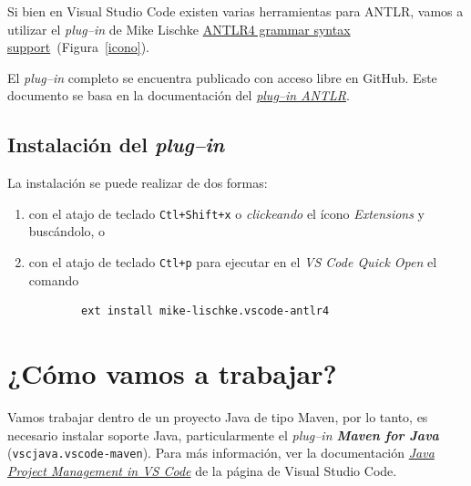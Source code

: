 \documentclass[a5paper,10pt]{article}
\begin{document}
Si bien en Visual Studio Code existen varias herramientas para ANTLR, vamos a utilizar el \emph{plug--in} de Mike Lischke \href{https://marketplace.visualstudio.com/items?itemName=mike-lischke.vscode-antlr4}{ANTLR4 grammar syntax support}~(Figura~\ref{icono}).

El \emph{plug--in} completo se encuentra publicado con acceso libre en GitHub.  Este documento se basa en la documentación del \href{https://github.com/mike-lischke/vscode-antlr4/tree/master/doc}{\emph{plug--in ANTLR}}.


\subsection*{Instalación del \emph{plug--in}}
\label{instalacionANTLR}

La instalación se puede realizar de dos formas:
\begin{enumerate}
	\item con el atajo de teclado \verb|Ctl+Shift+x| o \emph{clickeando} el ícono \emph{Extensions} y buscándolo, o
    \item con el atajo de teclado \verb|Ctl+p| para ejecutar en el \emph{VS Code Quick Open} el comando
    \begin{verbatim}
		ext install mike-lischke.vscode-antlr4
	\end{verbatim}
\end{enumerate}



\section{¿Cómo vamos a trabajar?}

Vamos trabajar dentro de un proyecto Java de tipo Maven, por lo tanto, es necesario instalar soporte Java, particularmente el \emph{plug--in \textbf{Maven for Java}} (\verb|vscjava.vscode-maven|).  Para más información, ver la documentación \href{https://code.visualstudio.com/docs/java/java-project}{\emph{Java Project Management in VS Code}} de la página de Visual Studio Code.
\end{document}
